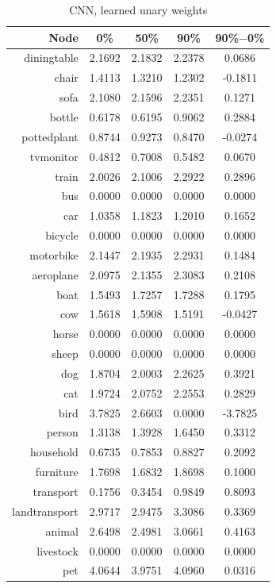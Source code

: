 \documentclass[11pt,a4paper]{article}
\begin{document}
\begin{table}[htbp]
\centering
\begin{tabular}{r|c|c|c|c}
Node & 0\% & 50\% & 90\% & 90\%$-$0\%\\\hline
diningtable   & 2.1692 & 2.1832 & 2.2378 & 0.0686\\
chair         & 1.4113 & 1.3210 & 1.2302 & -0.1811\\
sofa          & 2.1080 & 2.1596 & 2.2351 & 0.1271\\
bottle        & 0.6178 & 0.6195 & 0.9062 & 0.2884\\
pottedplant   & 0.8744 & 0.9273 & 0.8470 & -0.0274\\
tvmonitor     & 0.4812 & 0.7008 & 0.5482 & 0.0670\\
train         & 2.0026 & 2.1006 & 2.2922 & 0.2896\\
bus           & 0.0000 & 0.0000 & 0.0000 & 0.0000\\
car           & 1.0358 & 1.1823 & 1.2010 & 0.1652\\
bicycle       & 0.0000 & 0.0000 & 0.0000 & 0.0000\\
motorbike     & 2.1447 & 2.1935 & 2.2931 & 0.1484\\
aeroplane     & 2.0975 & 2.1355 & 2.3083 & 0.2108\\
boat          & 1.5493 & 1.7257 & 1.7288 & 0.1795\\
cow           & 1.5618 & 1.5908 & 1.5191 & -0.0427\\
horse         & 0.0000 & 0.0000 & 0.0000 & 0.0000\\
sheep         & 0.0000 & 0.0000 & 0.0000 & 0.0000\\
dog           & 1.8704 & 2.0003 & 2.2625 & 0.3921\\
cat           & 1.9724 & 2.0752 & 2.2553 & 0.2829\\
bird          & 3.7825 & 2.6603 & 0.0000 & -3.7825\\
person        & 1.3138 & 1.3928 & 1.6450 & 0.3312\\\hline
household     & 0.6735 & 0.7853 & 0.8827 & 0.2092\\
furniture     & 1.7698 & 1.6832 & 1.8698 & 0.1000\\
transport     & 0.1756 & 0.3454 & 0.9849 & 0.8093\\
landtransport & 2.9717 & 2.9475 & 3.3086 & 0.3369\\
animal        & 2.6498 & 2.4981 & 3.0661 & 0.4163\\
livestock     & 0.0000 & 0.0000 & 0.0000 & 0.0000\\
pet           & 4.0644 & 3.9751 & 4.0960 & 0.0316
\end{tabular}
\caption{CNN, learned unary weights}
\label{tab:unary}
\end{table}
\end{document}
